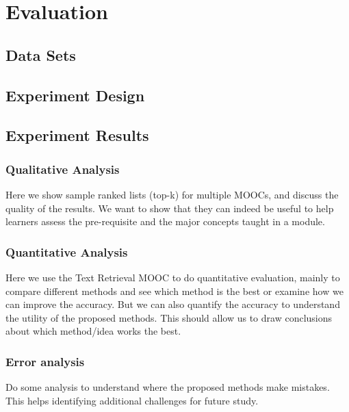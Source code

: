 \section{Evaluation}

\subsection{Data Sets}
\subsection{Experiment Design}

\subsection{Experiment Results}

\subsubsection{Qualitative Analysis}

Here we show sample ranked lists (top-k) for multiple MOOCs, and discuss the quality of the results. We want to show that they can indeed be useful to help learners assess the pre-requisite and the major concepts taught in a module. 

\subsubsection{Quantitative Analysis}

Here we use the Text Retrieval MOOC to do quantitative evaluation, mainly to compare different methods and see which method is the best or examine how we can improve the accuracy. But we can also quantify the accuracy to understand the utility of the proposed methods. 
This should allow us to draw conclusions about which method/idea works the best.

\subsubsection{Error analysis}

Do some analysis to understand where the proposed methods make mistakes. This helps identifying additional challenges for future study. 
